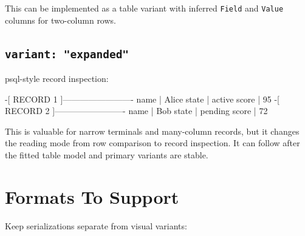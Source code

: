 This can be implemented as a table variant with inferred \texttt{F\allowbreak{}i\allowbreak{}e\allowbreak{}l\allowbreak{}d} and \texttt{V\allowbreak{}a\allowbreak{}l\allowbreak{}u\allowbreak{}e} columns for two-column rows.

\subsection{\texorpdfstring{\texttt{v\allowbreak{}a\allowbreak{}r\allowbreak{}i\allowbreak{}a\allowbreak{}n\allowbreak{}t\allowbreak{}:\allowbreak{} \allowbreak{}"\allowbreak{}e\allowbreak{}x\allowbreak{}p\allowbreak{}a\allowbreak{}n\allowbreak{}d\allowbreak{}e\allowbreak{}d\allowbreak{}"}}{}}\label{record-133-variant-expanded}

psql-style record inspection:

\begin{CodeBlock}
-[ RECORD 1 ]-------------------------
name   | Alice
state  | active
score  | 95
-[ RECORD 2 ]-------------------------
name   | Bob
state  | pending
score  | 72
\end{CodeBlock}

This is valuable for narrow terminals and many-column records, but it changes the reading mode from row comparison to record inspection. It can follow after the fitted table model and primary variants are stable.

\section{Formats To Support}\label{record-133-formats-to-support}

Keep serializations separate from visual variants:

